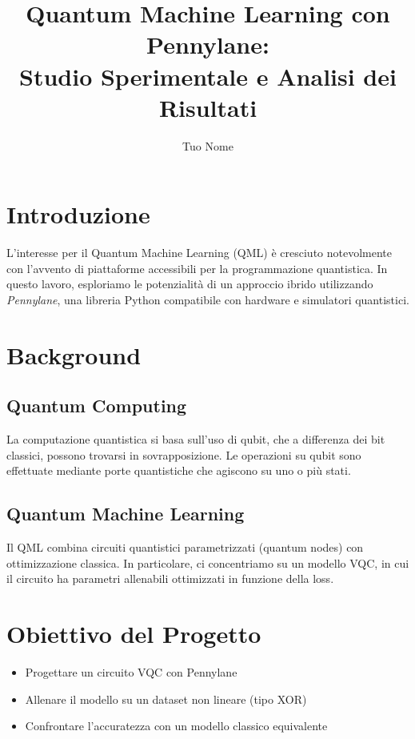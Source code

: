 \documentclass[10pt,twocolumn]{article}
\title{\textbf{Quantum Machine Learning con Pennylane: \\
Studio Sperimentale e Analisi dei Risultati}}
\author[1]{Tuo Nome}
\affil[1]{\small Dipartimento di Informatica Quantistica, Università di Esempio\\
\texttt{tuo.email@esempio.com}}
\date{}
\begin{document}

\section{Introduzione}
L’interesse per il Quantum Machine Learning (QML) è cresciuto notevolmente con l’avvento di piattaforme accessibili per la programmazione quantistica. In questo lavoro, esploriamo le potenzialità di un approccio ibrido utilizzando \textit{Pennylane}, una libreria Python compatibile con hardware e simulatori quantistici.

\section{Background}
\subsection{Quantum Computing}
La computazione quantistica si basa sull’uso di qubit, che a differenza dei bit classici, possono trovarsi in sovrapposizione. Le operazioni su qubit sono effettuate mediante porte quantistiche che agiscono su uno o più stati.

\subsection{Quantum Machine Learning}
Il QML combina circuiti quantistici parametrizzati (quantum nodes) con ottimizzazione classica. In particolare, ci concentriamo su un modello VQC, in cui il circuito ha parametri allenabili ottimizzati in funzione della loss.

\section{Obiettivo del Progetto}
\begin{itemize}
    \item Progettare un circuito VQC con Pennylane
    \item Allenare il modello su un dataset non lineare (tipo XOR)
    \item Confrontare l’accuratezza con un modello classico equivalente
\end{itemize}
\end{document}
